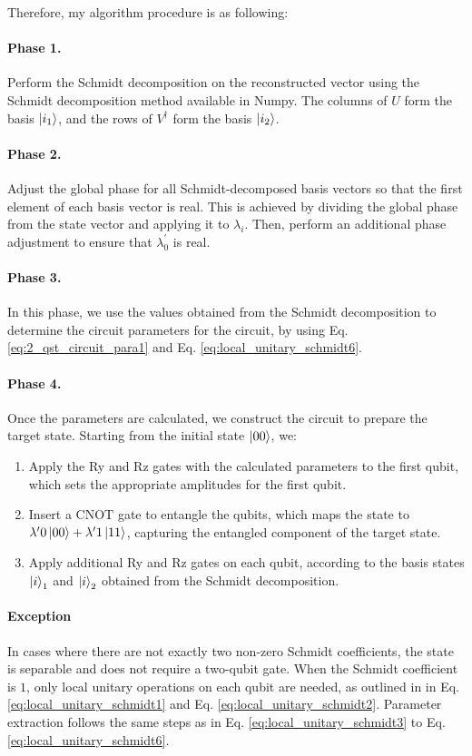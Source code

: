 \documentclass[a4paper, 11pt]{article}
\begin{document}
Therefore, my algorithm procedure is as following:
\paragraph{Phase 1. }
Perform the Schmidt decomposition on the reconstructed vector using the Schmidt decomposition method available in Numpy. 
The columns of $U$ form the basis $\ket{i_1}$, and the rows of $V^{\dagger}$ form the basis $\ket{i_2}$.

\paragraph{Phase 2. }
Adjust the global phase for all Schmidt-decomposed basis vectors so that the first element of each basis vector is real. 
This is achieved by dividing the global phase from the state vector and applying it to $\lambda_{i}$. 
Then, perform an additional phase adjustment to ensure that $\lambda_{0}^{\prime}$ is real.

\paragraph{Phase 3. }
In this phase, we use the values obtained from the Schmidt decomposition to determine the circuit parameters for the circuit, by using Eq. \ref{eq:2_qst_circuit_para1} and Eq. \ref{eq:local_unitary_schmidt6}. 
\paragraph{Phase 4. }
Once the parameters are calculated, we construct the circuit to prepare the target state. Starting from the initial state $\ket{00}$, we:
\begin{enumerate}
  \item Apply the Ry and Rz gates with the calculated parameters to the first qubit, which sets the appropriate amplitudes for the first qubit.
  \item Insert a CNOT gate to entangle the qubits, which maps the state to $\lambda^{\prime}0 \ket{00} + \lambda^{\prime}{1} \ket{11}$, capturing the entangled component of the target state.
  \item Apply additional Ry and Rz gates on each qubit, according to the basis states $\ket{i}_1$ and $\ket{i}_2$ obtained from the Schmidt decomposition.
\end{enumerate}

\paragraph{Exception}
In cases where there are not exactly two non-zero Schmidt coefficients, the state is separable and does not require a two-qubit gate. 
When the Schmidt coefficient is $1$, only local unitary operations on each qubit are needed, as outlined in in Eq. \ref{eq:local_unitary_schmidt1} and Eq. \ref{eq:local_unitary_schmidt2}.
Parameter extraction follows the same steps as in Eq. \ref{eq:local_unitary_schmidt3} to Eq. \ref{eq:local_unitary_schmidt6}.
\end{document}
